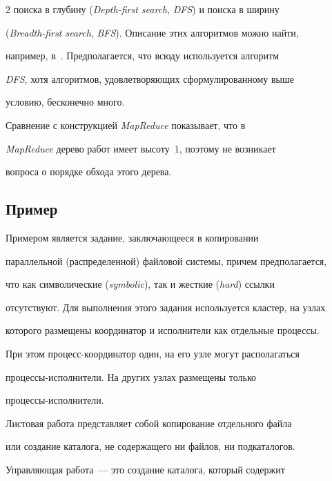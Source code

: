 \begin{multicols}{2}
поиска в глубину (\textit{Depth-first search}, \textit{DFS}) и поиска в ширину 


(\textit{Breadth-first search}, \textit{BFS}). Описание этих алгоритмов можно найти,\linebreak 


например, в~\cite{8-koz}. Предполагается, что всюду используется алгоритм 


\textit{DFS}, хотя алгоритмов, удовлетворяющих сформулированному выше 


условию, бесконечно много.


      


      Сравнение с конструкцией \textit{MapReduce} показывает, что в 


\textit{MapReduce} дерево работ имеет высоту~1, поэтому не возникает 


вопроса о порядке обхода этого дерева.





\subsection{Пример}


      


      Примером является задание, заключающееся в копировании 


параллельной (распределенной) файловой системы, причем предполагается, 


что как символические (\textit{symbolic}), так и жесткие (\textit{hard}) ссылки 


отсутствуют. Для выполнения этого задания используется кластер, на узлах 


которого размещены координатор и исполнители как отдельные процессы. 


При этом про\-цесс-ко\-ор\-ди\-на\-тор один, на его узле могут располагаться 


про\-цес\-сы-ис\-пол\-ни\-те\-ли. На других узлах размещены только 


      про\-цес\-сы-ис\-пол\-ни\-тели. 


      


      Листовая работа представляет собой копирование отдельного файла 


или создание каталога, не содержащего ни файлов, ни подкаталогов. 


Управ\-ля\-ющая работа~--- это создание каталога, который содержит 



\end{multicols}
